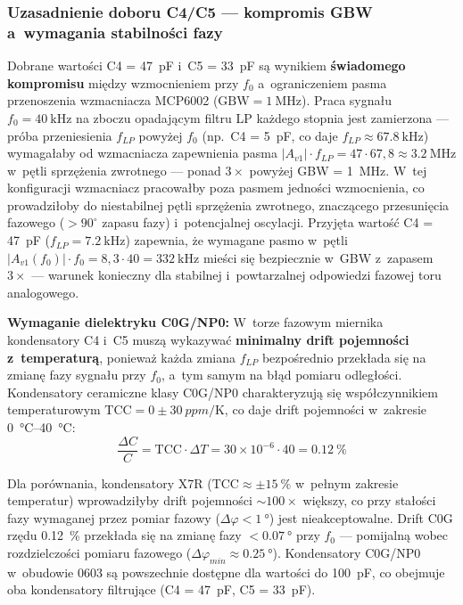 \documentclass[a4paper,11pt]{article}
\begin{document}
	\subsubsection{Uzasadnienie doboru C4/C5 --- kompromis GBW a~wymagania stabilności fazy}
	
	Dobrane wartości C4 = \SI{47}{\pico\farad} i~C5 = \SI{33}{\pico\farad} są
	wynikiem \textbf{świadomego kompromisu} między wzmocnieniem przy $f_0$ a~ograniczeniem
	pasma przenoszenia wzmacniacza MCP6002 ($\text{GBW} = \SI{1}{\mega\hertz}$).
	Praca sygnału $f_0 = \SI{40}{\kilo\hertz}$ na zboczu opadającym filtru LP
	każdego stopnia jest zamierzona --- próba przeniesienia $f_{LP}$ powyżej $f_0$
	(np.\ C4 = \SI{5}{\pico\farad}, co daje $f_{LP} \approx \SI{67,8}{\kilo\hertz}$)
	wymagałaby od wzmacniacza zapewnienia pasma $|A_{v1}| \cdot f_{LP} = 47 \cdot 67{,}8
	\approx \SI{3,2}{\mega\hertz}$ w~pętli sprzężenia zwrotnego --- ponad $3\times$
	powyżej GBW = \SI{1}{\mega\hertz}. W~tej konfiguracji wzmacniacz pracowałby
	poza pasmem jedności wzmocnienia, co prowadziłoby do niestabilnej pętli
	sprzężenia zwrotnego, znaczącego przesunięcia fazowego ($> 90^{\circ}$
	zapasu fazy) i~potencjalnej oscylacji. Przyjęta wartość C4 = \SI{47}{\pico\farad}
	($f_{LP} = \SI{7,2}{\kilo\hertz}$) zapewnia, że wymagane pasmo w~pętli
	$|A_{v1}(f_0)| \cdot f_0 = 8{,}3 \cdot 40 = \SI{332}{\kilo\hertz}$
	mieści się bezpiecznie w~GBW z~zapasem $3\times$ --- warunek konieczny
	dla stabilnej i~powtarzalnej odpowiedzi fazowej toru analogowego.
	
	\textbf{Wymaganie dielektryku C0G/NP0:} W~torze fazowym miernika
	kondensatory C4 i~C5 muszą wykazywać \textbf{minimalny drift pojemności
		z~temperaturą}, ponieważ każda zmiana $f_{LP}$ bezpośrednio przekłada się
	na zmianę fazy sygnału przy $f_0$, a~tym samym na błąd pomiaru odległości.
	Kondensatory ceramiczne klasy C0G/NP0 charakteryzują się współczynnikiem
	temperaturowym $\text{TCC} = 0 \pm \SI{30}{ppm/\kelvin}$, co daje drift
	pojemności w~zakresie \SIrange{0}{40}{\celsius}:
	\begin{equation}
		\frac{\Delta C}{C} = \text{TCC} \cdot \Delta T = 30 \times 10^{-6} \cdot 40 = \SI{0,12}{\percent}
		\label{eq:c0g_drift}
	\end{equation}
	
	Dla porównania, kondensatory X7R ($\text{TCC} \approx \pm \SI{15}{\percent}$
	w~pełnym zakresie temperatur) wprowadziłyby drift pojemności ${\sim}100\times$
	większy, co przy stałości fazy wymaganej przez pomiar fazowy ($\Delta\varphi
	< \SI{1}{\degree}$) jest nieakceptowalne. Drift C0G rzędu \SI{0,12}{\percent}
	przekłada się na zmianę fazy $< \SI{0,07}{\degree}$ przy $f_0$ --- pomijalną
	wobec rozdzielczości pomiaru fazowego ($\Delta\varphi_{min} \approx
	\SI{0,25}{\degree}$). Kondensatory C0G/NP0 w~obudowie 0603 są powszechnie
	dostępne dla wartości do \SI{100}{\pico\farad}, co obejmuje oba kondensatory
	filtrujące (C4 = \SI{47}{\pico\farad}, C5 = \SI{33}{\pico\farad}).
	
\end{document}
